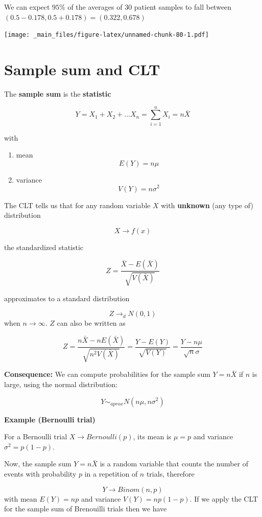 \documentclass[
]{book}
\providecommand{\tightlist}{%
  \setlength{\itemsep}{0pt}\setlength{\parskip}{0pt}}
\begin{document}
We can expect \(95\%\) of the averages of \(30\) patient samples to fall between
\((0.5-0.178, 0.5+0.178)= (0.322, 0.678)\)

\texttt{[image: \_main\_files/figure-latex/unnamed-chunk-80-1.pdf]}

\hypertarget{sample-sum-and-clt}{%
\section{Sample sum and CLT}\label{sample-sum-and-clt}}

The \textbf{sample sum} is the \textbf{statistic}

\[Y=X_1+X_2+...X_n=\sum_{i=1}^n X_i=n \bar{X}\]

with

\begin{enumerate}
\def\labelenumi{\arabic{enumi})}
\tightlist
\item
  mean \[E(Y)=n\mu\]
\item
  variance \[V(Y)=n\sigma^2\]
\end{enumerate}

The CLT tells us that for any random variable \(X\) with \textbf{unknown} (any type of) distribution

\[X \rightarrow f(x)\]

the standardized statistic

\[Z=\frac{\bar{X}-E(\bar{X})}{\sqrt{V(\bar{X})}}\]

approximates to a standard distribution

\[Z \rightarrow_d N(0,1)\] when \(n\rightarrow \infty\). \(Z\) can also be written as

\[Z=\frac{n\bar{X}-nE(\bar{X})}{\sqrt{n^2V(\bar{X})}}=\frac{Y-E(Y)}{\sqrt{V(Y)}}=\frac{Y-n\mu}{\sqrt{n}\sigma}\]

\textbf{Consequence:} We can compute probabilities for the sample sum \(Y=n\bar{X}\) if \(n\) is large, using the normal distribution:

\[Y \sim_{aprox}  N(n\mu, n\sigma^2)\]

\textbf{Example (Bernoulli trial)}

For a Bernoulli trial \(X \rightarrow Bernoulli(p)\), its mean is \(\mu=p\) and variance \(\sigma^2=p(1-p)\).

Now, the sample sum \(Y=n\bar{X}\) is a random variable that counts the number of events with probability \(p\) in a repetition of \(n\) trials, therefore

\[Y \rightarrow Binom(n, p)\]
with mean \(E(Y)=np\) and variance \(V(Y)=np(1-p)\). If we apply the CLT for the sample sum of Brenouilli trials then we have
\end{document}
